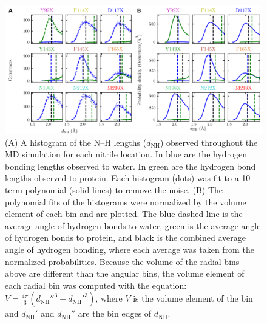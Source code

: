 \begin{figure}
    \center
    \includegraphics[width=\double]{figures-gfp-hbond/FigureS5_combined.png}
    \caption[Histograms of N--H lengths to calculate most probable $d_{\text{NH}}$]{
        (A) A histogram of the N--H lengths ($d_{\text{NH}}$) observed throughout the MD simulation for each nitrile location. 
        In blue are the hydrogen bonding lengths observed to water. 
        In green are the hydrogen bond lengths observed to protein. 
        Each histogram (dots) was fit to a 10-term polynomial (solid lines) to remove the noise. 
        (B) The polynomial fits of the histograms were normalized by the volume element of each bin and are plotted. 
        The blue dashed line is the average angle of hydrogen bonds to water, green is the average angle of hydrogen bonds to protein, and black is the combined average angle of hydrogen bonding, where each average was taken from the normalized probabilities. 
        Because the volume of the radial bins above are different than the angular bins, the volume element of each radial bin was computed with the equation: 
    $V = \frac{4\pi}{3}\left ( d_{\text{NH}}''^3 - d_{\text{NH}}'^3 \right )$, 
    where $V$ is the volume element of the bin and $d_{\text{NH}}'$ and $d_{\text{NH}}''$ are the bin edges of $d_{\text{NH}}$.
    }
    \label{fig:hbond-hist_dist}
\end{figure}

